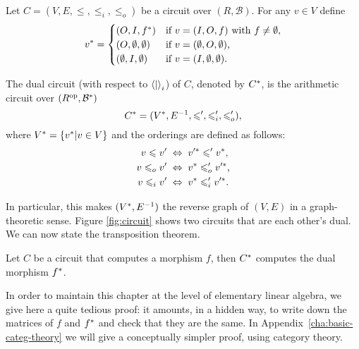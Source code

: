 \begin{definition}
  \label{def:dual}
  Let $C=(V,E,\le,\le_i,\le_o)$ be a circuit over
  $(R,\mathcal{B})$. For any $v\in V$ define
  \begin{equation}
    \label{eq:244}
    v^\ast =
    \begin{cases}
    (O,I,f^\ast)          &\text{if $v=(I,O,f)$ with $f\ne\emptyset$,}\\
    (O,\emptyset,\emptyset) &\text{if $v=(\emptyset,O,\emptyset)$,}\\
    (\emptyset,I,\emptyset) &\text{if $v=(I,\emptyset,\emptyset)$.}
    \end{cases}
  \end{equation}

  The dual circuit (with respect to $\left\langle  \middle|  \right\rangle_i$) of $C$, denoted
  by $C^\ast$, is the arithmetic circuit over
  $(R^{\mathrm{op}},\mathcal{B}^\ast)$
  \[C^\ast = (V^\ast, E^{-1},\leqslant',\leqslant_i',\leqslant_o')\text{,}\]
  where $V^\ast=\{v^\ast|v\in V\}$ and the orderings are defined
  as follows:
  \begin{align}
    v \leqslant v' \;&\Leftrightarrow\; v'^\ast \leqslant' v^\ast\text{,}\\
    v \leqslant_o v' \;&\Leftrightarrow\; v^\ast \leqslant_o' v'^\ast\text{,}\\
    v \leqslant_i v' \;&\Leftrightarrow\; v^\ast \leqslant_i' v'^\ast\text{.}
  \end{align}
\end{definition}

In particular, this makes $(V^\ast,E^{-1})$ the reverse graph of
$(V,E)$ in a graph-theoretic sense. Figure \ref{fig:circuit} shows two
circuits that are each other's dual. We can now state the
transposition theorem.

\begin{theorem}
  \label{th:tellegen}
  Let $C$ be a circuit that computes a morphism $f$, then $C^\ast$
  computes the dual morphism $f^\ast$.
\end{theorem}

  In order to
maintain this chapter at the level of elementary linear algebra, we
give here a quite tedious proof: it amounts, in a hidden way, to write
down the matrices of $f$ and $f^\ast$ and check that they are the
same. In Appendix~\ref{cha:basic-categ-theory} we will give a
conceptually simpler proof, using category theory.


